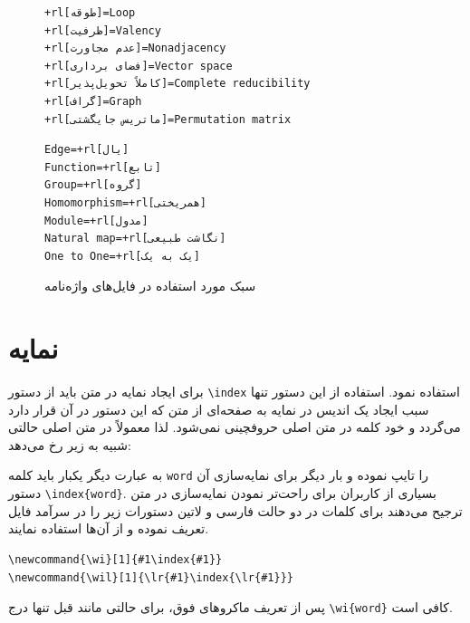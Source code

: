 {{{\begin{figure}[h]
\begin{minipage}{.55\textwidth}
\vspace*{1mm}
\begin{Verbatim}[commandchars=+\[\], frame=single, framesep=1mm]
+rl[طوقه]=Loop
+rl[ظرفیت]=Valency
+rl[عدم مجاورت]=Nonadjacency
+rl[فضای برداری]=Vector space
+rl[کاملاً تحویل‌پذیر]=Complete reducibility
+rl[گراف]=Graph
+rl[ماتریس جایگشتی]=Permutation matrix 
\end{Verbatim}
\end{minipage}
\hfill
\begin{minipage}{.4\textwidth}
\vspace*{1mm}
\begin{Verbatim}[commandchars=+\[\], frame=single, framesep=1mm]
Edge=+rl[یال]
Function=+rl[تابع]
Group=+rl[گروه]
Homomorphism=+rl[همریختی]
Module=+rl[مدول]
Natural map=+rl[نگاشت طبیعی]
One to One=+rl[یک به یک]
\end{Verbatim}    
\end{minipage}
\caption{سبک مورد استفاده در فایل‌های واژه‌نامه}
\label{fig:dictionaries}
\end{figure}

    \section{نمایه}\label{Namaye}
    
    برای ایجاد نمایه در متن باید از دستور \Verb+\index+ استفاده نمود. 
    استفاده از این دستور تنها سبب ایجاد یک اندیس در نمایه به صفحه‌ای از متن که این دستور  در آن قرار دارد می‌گردد و خود کلمه در متن اصلی حروفچینی نمی‌شود. 
    لذا معمولاً در متن اصلی حالتی شبیه به زیر رخ می‌دهد:
    
    به عبارت دیگر یکبار باید کلمه \Verb+word+ را تایپ نموده و بار دیگر برای نمایه‌سازی آن دستور \Verb+\index{word}+. بسیاری از کاربران 
    برای راحت‌تر نمودن نمایه‌سازی در متن ترجیح می‌دهند برای کلمات در دو حالت فارسی و لاتین دستورات زیر را در سرآمد فایل تعریف نموده و از آن‌ها استفاده 
    نمایند. 
    
\begin{Verbatim}
\newcommand{\wi}[1]{#1\index{#1}}
\newcommand{\wil}[1]{\lr{#1}\index{\lr{#1}}}
\end{Verbatim}
    
    پس از تعریف ماکروهای فوق، برای حالتی مانند قبل تنها درج \Verb+\wi{word}+ کافی است. 

}}}
